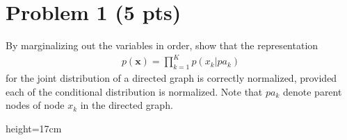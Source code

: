 \section*{Problem 1 (5 pts)}

By marginalizing out the variables in order, show that the representation
\begin{align*}
    p(\mathbf{x}) = \prod_{k=1}^{K} p(x_k | pa_k) 
\end{align*}
for the joint distribution of a directed graph is correctly normalized, provided each of the conditional distribution is normalized.
Note that $pa_k$ denote parent nodes of node $x_k$ in the directed graph.

\begin{soln}{height=17cm}
\end{soln}

